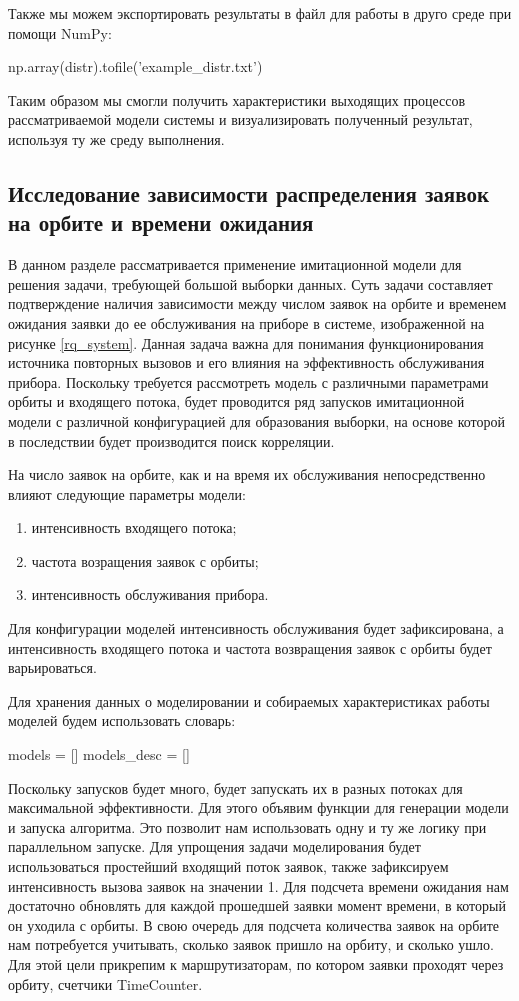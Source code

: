 Также мы можем экспортировать результаты в файл для работы в друго среде при помощи NumPy:
\begin{pyin} [rqtestchar]
np.array(distr).tofile('example_distr.txt')
\end{pyin}
Таким образом мы смогли получить характеристики выходящих процессов рассматриваемой модели системы и визуализировать полученный результат, используя ту же среду выполнения.

\subsection{Исследование зависимости распределения заявок на орбите и времени ожидания}
В данном разделе рассматривается применение имитационной модели для решения задачи, требующей большой выборки данных. Суть задачи составляет подтверждение наличия зависимости между числом заявок на орбите и временем ожидания заявки до ее обслуживания на приборе в системе, изображенной на рисунке \ref{rq_system}. Данная задача важна для понимания функционирования источника повторных вызовов и его влияния на эффективность обслуживания прибора. Поскольку требуется рассмотреть модель с различными параметрами орбиты и входящего потока, будет проводится ряд запусков имитационной модели с различной конфигурацией для образования выборки, на основе которой в последствии будет производится поиск корреляции.

На число заявок на орбите, как и на время их обслуживания непосредственно влияют следующие параметры модели:
\begin{enumerate}
	\item интенсивность входящего потока;
	\item частота возращения заявок с орбиты;
	\item интенсивность обслуживания прибора.
\end{enumerate} 

Для конфигурации моделей интенсивность обслуживания будет зафиксирована, а интенсивность входящего потока и частота возвращения заявок с орбиты будет варьироваться.

Для хранения данных о моделировании и собираемых характеристиках работы моделей будем использовать словарь:
\begin{pyin} 
models = []
models_desc = []
\end{pyin}

Поскольку запусков будет много, будет запускать их в разных потоках для максимальной эффективности. Для этого объявим функции для генерации модели и запуска алгоритма. Это позволит нам использовать одну и ту же логику при параллельном запуске. Для упрощения задачи моделирования будет использоваться простейший входящий поток заявок, также зафиксируем интенсивность вызова заявок на значении 1. Для подсчета времени ожидания нам достаточно обновлять для каждой прошедшей заявки момент времени, в который он уходила с орбиты. В свою очередь для подсчета количества заявок на орбите нам потребуется учитывать, сколько заявок пришло на орбиту, и сколько ушло. Для этой цели прикрепим к маршрутизаторам, по котором заявки проходят через орбиту, счетчики TimeCounter.


